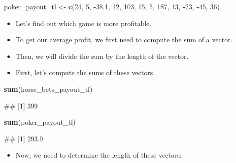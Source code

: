 \documentclass[
]{book}
\newenvironment{Shaded}{\begin{snugshade}}{\end{snugshade}}
\newcommand{\DecValTok}[1]{\textcolor[rgb]{0.00,0.00,0.81}{#1}}
\newcommand{\FloatTok}[1]{\textcolor[rgb]{0.00,0.00,0.81}{#1}}
\newcommand{\FunctionTok}[1]{\textcolor[rgb]{0.13,0.29,0.53}{\textbf{#1}}}
\newcommand{\NormalTok}[1]{#1}
\newcommand{\OtherTok}[1]{\textcolor[rgb]{0.56,0.35,0.01}{#1}}
\newcommand{\SpecialCharTok}[1]{\textcolor[rgb]{0.81,0.36,0.00}{\textbf{#1}}}
\providecommand{\tightlist}{%
  \setlength{\itemsep}{0pt}\setlength{\parskip}{0pt}}
\begin{document}
\begin{Shaded}
\begin{Highlighting}[]
\NormalTok{poker\_payout\_tl }\OtherTok{\textless{}{-}} \FunctionTok{c}\NormalTok{(}\DecValTok{24}\NormalTok{, }\DecValTok{5}\NormalTok{, }\SpecialCharTok{{-}}\FloatTok{38.1}\NormalTok{, }\DecValTok{12}\NormalTok{, }\DecValTok{103}\NormalTok{, }\DecValTok{15}\NormalTok{, }\DecValTok{5}\NormalTok{, }\DecValTok{187}\NormalTok{, }\DecValTok{13}\NormalTok{, }\SpecialCharTok{{-}}\DecValTok{23}\NormalTok{, }\SpecialCharTok{{-}}\DecValTok{45}\NormalTok{, }\DecValTok{36}\NormalTok{)}
\end{Highlighting}
\end{Shaded}

\begin{itemize}
\tightlist
\item
  Let's find out which game is more profitable.
\item
  To get our average profit, we first need to compute the sum of a vector.
\item
  Then, we will divide the sum by the length of the vector.
\item
  First, let's compute the sums of these vectors.
\end{itemize}

\begin{Shaded}
\begin{Highlighting}[]
\FunctionTok{sum}\NormalTok{(horse\_bets\_payout\_tl)}
\end{Highlighting}
\end{Shaded}

\begin{Shaded}
\begin{Highlighting}[]
\NormalTok{\#\# [1] 399}
\end{Highlighting}
\end{Shaded}

\begin{Shaded}
\begin{Highlighting}[]
\FunctionTok{sum}\NormalTok{(poker\_payout\_tl)}
\end{Highlighting}
\end{Shaded}

\begin{Shaded}
\begin{Highlighting}[]
\NormalTok{\#\# [1] 293.9}
\end{Highlighting}
\end{Shaded}

\begin{itemize}
\tightlist
\item
  Now, we need to determine the length of these vectors:
\end{itemize}
\end{document}
